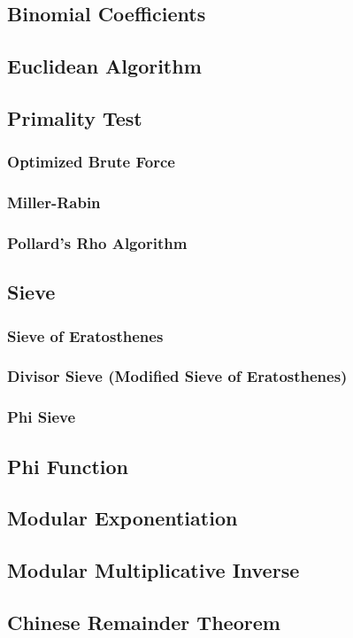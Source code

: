 \documentclass[8pt,a4paper,landscape,oneside]{amsart}
\begin{document}
\begin{multicols*}{3}
	\subsection{Binomial Coefficients}
	\subsection{Euclidean Algorithm}
	\subsection{Primality Test}
		\subsubsection{Optimized Brute Force}
		\subsubsection{Miller-Rabin}
		\subsubsection{Pollard's Rho Algorithm}
	\subsection{Sieve}
		\subsubsection{Sieve of Eratosthenes}
		\subsubsection{Divisor Sieve (Modified Sieve of Eratosthenes)}
		\subsubsection{Phi Sieve}
	\subsection{Phi Function}
	\subsection{Modular Exponentiation}
	\subsection{Modular Multiplicative Inverse}
	\subsection{Chinese Remainder Theorem}

\end{multicols*}
\end{document}
